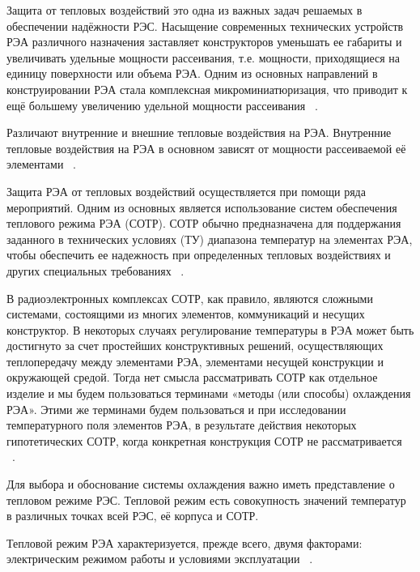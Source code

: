 
Защита от тепловых воздействий это одна из важных задач решаемых в
обеспечении надёжности РЭС.
Насыщение современных технических устройств РЭА различного назначения
заставляет конструкторов уменьшать ее габариты и увеличивать удельные
мощности рассеивания, т.е. мощности, приходящиеся на единицу
поверхности или объема РЭА. Одним из основных направлений в
конструировании РЭА стала комплексная микроминиатюризация, что
приводит к ещё большему увеличению удельной мощности рассеивания
~\cite{Rotkop1976}.

Различают внутренние и внешние тепловые воздействия на РЭА.
Внутренние тепловые воздействия на РЭА в основном зависят от мощности
рассеиваемой её элементами ~\cite{Rotkop1976}.

Защита РЭА от тепловых воздействий осуществляется при помощи ряда
мероприятий. Одним из основных является использование систем
обеспечения теплового режима РЭА (СОТР). СОТР обычно предназначена для
поддержания заданного в технических условиях (ТУ) диапазона температур
на элементах РЭА, чтобы обеспечить ее надежность при определенных
тепловых воздействиях и других специальных требованиях ~\cite{Rotkop1976}.

В радиоэлектронных комплексах СОТР, как правило, являются сложными
системами, состоящими из многих элементов, коммуникаций и несущих
конструктор. В некоторых случаях регулирование температуры в РЭА может
быть достигнуто за счет простейших конструктивных решений,
осуществляющих теплопередачу между элементами РЭА, элементами несущей
конструкции и окружающей средой. Тогда нет смысла рассматривать СОТР
как отдельное изделие и мы будем пользоваться терминами «методы (или
способы) охлаждения РЭА». Этими же терминами будем пользоваться и при
исследовании температурного поля элементов РЭА, в результате действия
некоторых гипотетических СОТР, когда конкретная конструкция СОТР не
рассматривается ~\cite{Rotkop1976}.

Для выбора и обоснование системы охлаждения важно иметь представление
о тепловом режиме РЭС.  Тепловой режим есть совокупность значений
температур в различных точках всей РЭС, её корпуса и СОТР.

Тепловой режим РЭА характеризуется, прежде всего, двумя факторами:
электрическим режимом работы и условиями эксплуатации ~\cite{Rotkop1976}.

